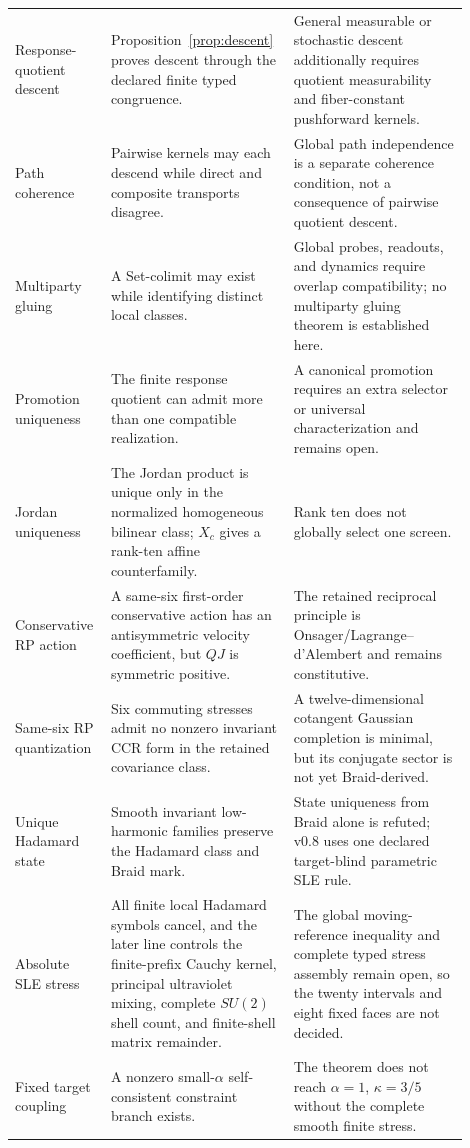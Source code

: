 \documentclass[11pt]{article}
\theoremstyle{definition}
\theoremstyle{remark}
\begin{document}
\begin{longtable}{>{\raggedright\arraybackslash}p{0.19\linewidth}>{\raggedright\arraybackslash}p{0.34\linewidth}>{\raggedright\arraybackslash}p{0.37\linewidth}}
Response-quotient descent & Proposition~\ref{prop:descent} proves descent through the declared finite typed congruence. & General measurable or stochastic descent additionally requires quotient measurability and fiber-constant pushforward kernels.\\
Path coherence & Pairwise kernels may each descend while direct and composite transports disagree. & Global path independence is a separate coherence condition, not a consequence of pairwise quotient descent.\\
Multiparty gluing & A Set-colimit may exist while identifying distinct local classes. & Global probes, readouts, and dynamics require overlap compatibility; no multiparty gluing theorem is established here.\\
Promotion uniqueness & The finite response quotient can admit more than one compatible realization. & A canonical promotion requires an extra selector or universal characterization and remains open.\\
Jordan uniqueness & The Jordan product is unique only in the normalized homogeneous bilinear class; $X_c$ gives a rank-ten affine counterfamily. & Rank ten does not globally select one screen.\\
Conservative RP action & A same-six first-order conservative action has an antisymmetric velocity coefficient, but $QJ$ is symmetric positive. & The retained reciprocal principle is Onsager/Lagrange--d'Alembert and remains constitutive.\\
Same-six RP quantization & Six commuting stresses admit no nonzero invariant CCR form in the retained covariance class. & A twelve-dimensional cotangent Gaussian completion is minimal, but its conjugate sector is not yet Braid-derived.\\
Unique Hadamard state & Smooth invariant low-harmonic families preserve the Hadamard class and Braid mark. & State uniqueness from Braid alone is refuted; v0.8 uses one declared target-blind parametric SLE rule.\\
Absolute SLE stress & All finite local Hadamard symbols cancel, and the later line controls the finite-prefix Cauchy kernel, principal ultraviolet mixing, complete $SU(2)$ shell count, and finite-shell matrix remainder. & The global moving-reference inequality and complete typed stress assembly remain open, so the twenty intervals and eight fixed faces are not decided.\\
Fixed target coupling & A nonzero small-$\alpha$ self-consistent constraint branch exists. & The theorem does not reach $\alpha=1$, $\kappa=3/5$ without the complete smooth finite stress.\\

\end{longtable}
\end{document}

